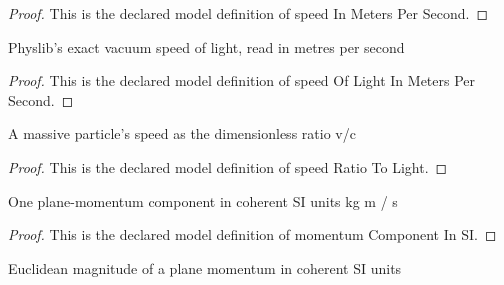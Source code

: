\begin{proof}
  This is the declared model definition of speed In Meters Per Second.
\end{proof}
\begin{definition}
  \label{def:physics:phyx-mini-0613:phyxminiproblems-problemphyxmini0613-speedoflightinmeterspersecond}
  Physlib's exact vacuum speed of light, read in metres per second
\end{definition}
\begin{proof}
  This is the declared model definition of speed Of Light In Meters Per Second.
\end{proof}
\begin{definition}
  \label{def:physics:phyx-mini-0613:phyxminiproblems-problemphyxmini0613-speedratiotolight}
  A massive particle's speed as the dimensionless ratio v/c
\end{definition}
\begin{proof}
  This is the declared model definition of speed Ratio To Light.
\end{proof}
\begin{definition}
  \label{def:physics:phyx-mini-0613:phyxminiproblems-problemphyxmini0613-momentumcomponentinsi}
  One plane-momentum component in coherent SI units kg m / s
\end{definition}
\begin{proof}
  This is the declared model definition of momentum Component In SI.
\end{proof}
\begin{definition}
  \label{def:physics:phyx-mini-0613:phyxminiproblems-problemphyxmini0613-momentummagnitudeinsi}
  Euclidean magnitude of a plane momentum in coherent SI units
\end{definition}
